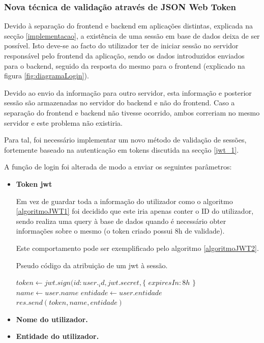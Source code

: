 \cleardoublepage
\subsubsection{Nova técnica de validação através de JSON Web Token} \label{jwt_2}

Devido à separação do frontend e backend em aplicações distintas, explicada na secção \ref{implementacao}, a existência de uma sessão em base de dados deixa de ser possível. Isto deve-se ao facto do utilizador ter de iniciar sessão no servidor responsável pelo frontend da aplicação, sendo os dados introduzidos enviados para o backend, seguido da resposta do mesmo para o frontend (explicado na figura \ref{fig:diagramaLogin}).

Devido ao envio da informação para outro servidor, esta informação e posterior sessão são armazenadas no servidor do backend e não do frontend. Caso a separação do frontend e backend não tivesse ocorrido, ambos correriam no mesmo servidor e este problema não existiria.

Para tal, foi necessário implementar um novo método de validação de sessões, fortemente baseado na autenticação em tokens discutida na secção \ref{jwt_1}.

A função de login foi alterada de modo a enviar os seguintes parâmetros:

\begin{itemize}
    \item \textbf{Token \gls{jwt}}
    
    Em vez de guardar toda a informação do utilizador como o algoritmo \ref{algoritmoJWT1} foi decidido que este iria apenas conter o ID do utilizador, sendo realiza uma query à base de dados quando é necessário obter informações sobre o mesmo (o token criado possui 8h de validade).
    
    Este comportamento pode ser exemplificado pelo algoritmo \ref{algoritmoJWT2}.
    
    \begin{algorithm}
        \caption{Pseudo código da atribuição de um \gls{jwt} à sessão.}
        \label{algoritmoJWT2}
        \begin{algorithmic}[1]
            \State $token \gets jwt.sign({id: user._id}, jwt.secret, \{$
            \State \indent $expiresIn : 8h$
            \State $\}$
            \State $name \gets user.name$
            \State $entidade \gets user.entidade$
            \State $res.send(token,name,entidade)$
        \EndFunction
        \end{algorithmic}
    \end{algorithm}
        
    \item \textbf{Nome do utilizador.}
    
    
    \item \textbf{Entidade do utilizador.}
\end{itemize}

